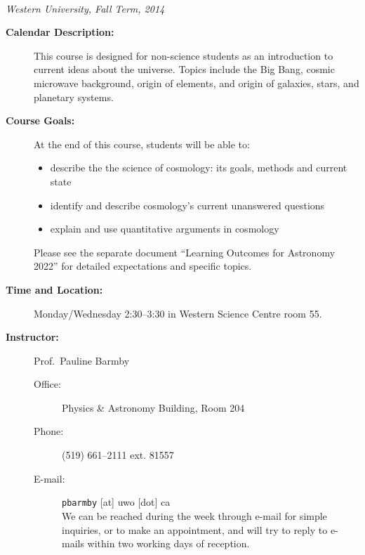\documentclass[12pt]{article}
\begin{document}
\thispagestyle{empty}

\begin{center}
\\
\vspace{0.1in}
{\it Western University, Fall Term, 2014}
\end{center}

\vspace{0.0in}

\begin{description}

\item[\bf Calendar Description:] This course is designed for non-science students as an introduction to current ideas about the universe. Topics include the Big Bang, cosmic microwave background, origin of elements, and origin of galaxies, stars, and planetary systems.

\item[\bf Course Goals:] \hspace{1cm}   

At the end of this course, students will be able to:
\begin{itemize}
\item describe the the science of cosmology: its goals, methods and current state
\item identify and describe cosmology's current unanswered questions 
\item explain and use quantitative arguments in cosmology 
\end{itemize}
Please see the separate document ``Learning Outcomes for Astronomy 2022'' for 
detailed expectations and specific topics. 

\item[\bf Time and Location:] Monday/Wednesday 2:30--3:30 in Western Science Centre room 55.

\item[\bf Instructor:]  Prof.\ Pauline Barmby 
 \begin{description}

   \item[Office:] Physics \& Astronomy Building, Room  204 

   \item[Phone:] (519) 661--2111 ext.   81557 

   \item[E-mail:]  \verb$pbarmby$ [at] uwo [dot] ca\\ 
   We can be reached during the week through e-mail for simple inquiries, or to make an appointment, and will try to reply to e-mails within two working days of reception. \\ 
   

\end{description}
\end{description}
\end{document}
